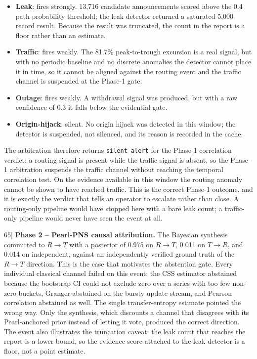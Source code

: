 \begin{itemize}
  \item \textbf{Leak}: fires strongly. 13{,}716 candidate
    announcements scored above the 0.4 path-probability threshold;
    the leak detector returned a saturated 5{,}000-record result.
    Because the result was truncated, the count in the report
    is a floor rather than an estimate.
  \item \textbf{Traffic}: fires weakly. The 81.7\% peak-to-trough
    excursion is a real signal, but with no periodic baseline and
    no discrete anomalies the detector cannot place it in time,
    so it cannot be aligned against the routing event and the
    traffic channel is suspended at the Phase-1 gate.
  \item \textbf{Outage}: fires weakly. A withdrawal signal was
    produced, but with a raw confidence of 0.3 it falls below the
    evidential gate.
  \item \textbf{Origin-hijack}: silent. No origin hijack was
    detected in this window; the detector is suspended, not
    silenced, and its reason is recorded in the cache.
\end{itemize}
The arbitration therefore returns \texttt{silent\_alert} for the
Phase-1 correlation verdict: a routing signal is present
while the traffic signal is absent, so the Phase-1 arbitration
suspends the traffic channel without reaching the temporal
correlation test. On the evidence available in this window the
routing anomaly cannot be shown to have reached traffic. This is
the correct Phase-1 outcome, and it is exactly the verdict that
tells an operator to escalate rather than close. A routing-only
pipeline would have stopped here with a bare leak count; a
traffic-only pipeline would never have seen the event at all.

    65|\medskip
\noindent\textbf{Phase 2 -- Pearl-PNS causal attribution.}
The Bayesian synthesis committed to $R \to T$ with a posterior of
0.975 on $R \to T$, 0.011 on $T \to R$, and 0.014 on independent,
against an independently verified ground truth of the
$R \to T$ direction. This is the case that motivates the
abstention gate. Every individual classical channel failed on this
event: the CSS estimator abstained because the bootstrap CI could
not exclude zero over a series with too few non-zero buckets,
Granger abstained on the bursty update stream, and Pearson
correlation abstained as well. The single transfer-entropy
estimate pointed the wrong way. Only the synthesis, which discounts
a channel that disagrees with its Pearl-anchored prior instead of
letting it vote, produced the correct direction. The event also
illustrates the truncation caveat: the leak count that reaches the
report is a lower bound, so the evidence score attached to the
leak detector is a floor, not a point estimate.

